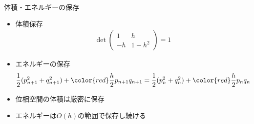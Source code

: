 \begin{frame}[t,fragile]{体積・エネルギーの保存}
  \begin{itemize}
    \setlength{\itemsep}{1em}
  \item 体積保存
    \begin{align*}
      \det \begin{pmatrix} 1 & h \\ -h & 1-h^2 \end{pmatrix} = 1
    \end{align*}
  \item エネルギーの保存
    \begin{align*}
      \frac{1}{2}(p_{n+1}^2+q_{n+1}^2) + {\color{red}\frac{h}{2} p_{n+1} q_{n+1}} = \frac{1}{2}(p_{n}^2+q_{n}^2) + {\color{red}\frac{h}{2} p_{n} q_{n}}
    \end{align*}
  \item 位相空間の体積は厳密に保存
  \item エネルギーは$O(h)$の範囲で保存し続ける
  \end{itemize}
\end{frame}
